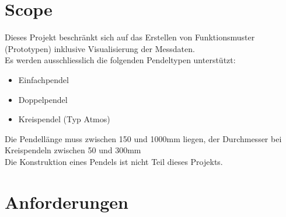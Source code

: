 \section{Scope}
Dieses Projekt beschränkt sich auf das Erstellen von Funktionsmuster (Prototypen) inklusive Visualisierung der Messdaten.\\
Es werden ausschliesslich die folgenden Pendeltypen unterstützt:
\begin{itemize}
	\item Einfachpendel
	\item Doppelpendel
	\item Kreispendel (Typ Atmos)
\end{itemize}
Die Pendellänge muss zwischen 150 und 1000mm liegen, der Durchmesser bei Kreispendeln zwischen 50 und 300mm\\
Die Konstruktion eines Pendels ist nicht Teil dieses Projekts.

\section{Anforderungen}
